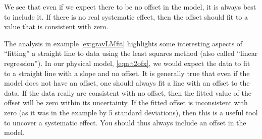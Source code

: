 \begin{example}
We see that even if we expect there to be no offset in the model, it is always best to include it. If there is no real systematic effect, then the offset should fit to a value that is consistent with zero. 

\end{example}

The analysis in example \ref{ex:gravLMfit} highlights some interesting aspects of ``fitting'' a straight line to data using the least squares method (also called ``linear regression''). In our physical model, \ref{eqn:t2ofx}, we would expect the data to fit to a straight line with a slope and no offset. It is generally true that even if the model does not have an offset, one should always fit a line with an offset to the data. If the data really are consistent with no offset, then the fitted value of the offset will be zero within its uncertainty. If the fitted offset is inconsistent with zero (as it was in the example by 5 standard deviations), then this is a useful tool to uncover a systematic effect. You should thus always include an offset in the model. 

